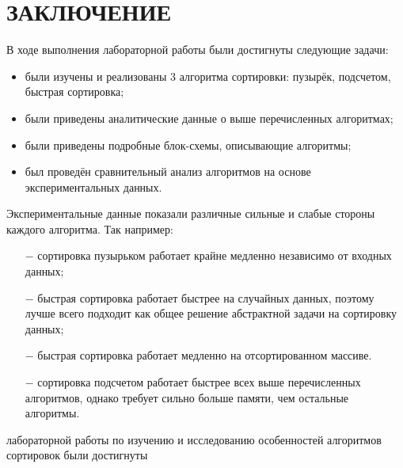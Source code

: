 \chapter*{ЗАКЛЮЧЕНИЕ}

В ходе выполнения лабораторной работы были достигнуты следующие задачи:

\begin{itemize}
    \item были изучены и реализованы 3 алгоритма сортировки: пузырёк, подсчетом, быстрая сортировка;
    \item были приведены аналитические данные о выше перечисленных алгоритмах;
    \item были приведены подробные блок-схемы, описывающие алгоритмы;
    \item был проведён сравнительный анализ алгоритмов на основе экспериментальных данных.
\end{itemize}

Экспериментальные данные показали различные сильные и слабые стороны каждого алгоритма.
Так например:
\begin{itemize}
    \item[$-$] сортировка пузырьком работает крайне медленно независимо от входных данных;
    \item[$-$] быстрая сортировка работает быстрее на случайных данных, поэтому лучше всего подходит как общее решение абстрактной задачи на сортировку данных;
    \item[$-$] быстрая сортировка работает медленно на отсортированном массиве.
    \item[$-$] сортировка подсчетом работает быстрее всех выше перечисленных алгоритмов, однако требует сильно больше памяти, чем остальные алгоритмы.
\end{itemize}

 лабораторной работы по изучению и исследованию особенностей алгоритмов сортировок были достигнуты